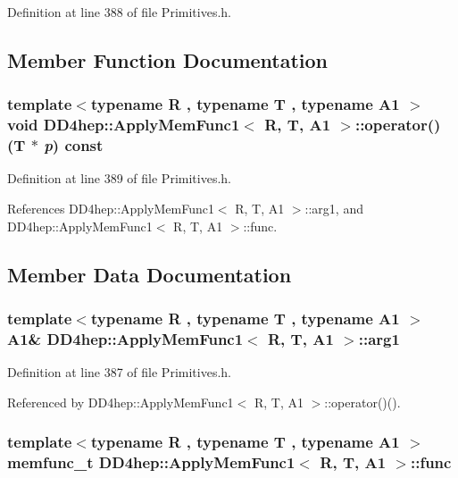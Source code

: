 Definition at line 388 of file Primitives.h.

\subsection{Member Function Documentation}
\hypertarget{struct_d_d4hep_1_1_apply_mem_func1_ab3d4262b3d53ce31d0930561e3e15bb0}{
\subsubsection[{operator()}]{\setlength{\rightskip}{0pt plus 5cm}template$<$typename R , typename T , typename A1 $>$ void {\bf DD4hep::ApplyMemFunc1}$<$ R, {\bf T}, A1 $>$::operator() ({\bf T} $\ast$ {\em p}) const}}
\label{struct_d_d4hep_1_1_apply_mem_func1_ab3d4262b3d53ce31d0930561e3e15bb0}


Definition at line 389 of file Primitives.h.

References DD4hep::ApplyMemFunc1$<$ R, T, A1 $>$::arg1, and DD4hep::ApplyMemFunc1$<$ R, T, A1 $>$::func.

\subsection{Member Data Documentation}
\hypertarget{struct_d_d4hep_1_1_apply_mem_func1_aa1ef32d2750d2c3a55881e9198ba78d2}{
\subsubsection[{arg1}]{\setlength{\rightskip}{0pt plus 5cm}template$<$typename R , typename T , typename A1 $>$ A1\& {\bf DD4hep::ApplyMemFunc1}$<$ R, {\bf T}, A1 $>$::{\bf arg1}}}
\label{struct_d_d4hep_1_1_apply_mem_func1_aa1ef32d2750d2c3a55881e9198ba78d2}


Definition at line 387 of file Primitives.h.

Referenced by DD4hep::ApplyMemFunc1$<$ R, T, A1 $>$::operator()().\hypertarget{struct_d_d4hep_1_1_apply_mem_func1_ac13bb60da947716106d65b273854ef73}{
\subsubsection[{func}]{\setlength{\rightskip}{0pt plus 5cm}template$<$typename R , typename T , typename A1 $>$ {\bf memfunc\_\-t} {\bf DD4hep::ApplyMemFunc1}$<$ R, {\bf T}, A1 $>$::{\bf func}}}
\label{struct_d_d4hep_1_1_apply_mem_func1_ac13bb60da947716106d65b273854ef73}


